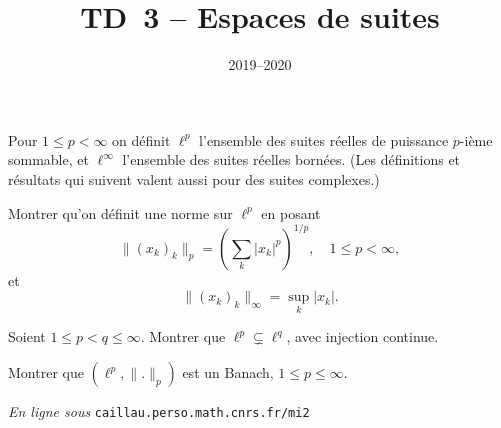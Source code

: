 \documentclass[11pt,a4paper]{article}
\title{TD~3 -- Espaces de suites}
\date{2019--2020}
\def\K{\mathbf{K}}
\def\iy{\infty}
\def\vphi{\varphi}
\begin{document}
\maketitle

Pour $1 \leq p < \iy$ on d\'efinit $\ell^p$ l'ensemble des suites r\'eelles
de puissance $p$-i\`eme sommable, et $\ell^\iy$ l'ensemble des suites r\'eelles born\'ees.
(Les d\'efinitions et r\'esultats qui suivent valent aussi pour des suites complexes.)

\begin{Exercice}
Montrer qu'on
d\'efinit une norme sur $\ell^p$ en posant
\[ \|(x_k)_k\|_p = (\sum_k |x_k|^p)^{1/p},\quad 1 \leq p < \iy, \]
et
\[ \|(x_k)_k\|_\iy = \sup_k |x_k|. \]
\end{Exercice}

\begin{Exercice} Soient $1 \leq p < q \leq \infty$.
Montrer que $\ell^p \subsetneq \ell^q$, avec
injection continue.
\end{Exercice} \vspace*{1em}

\begin{Exercice} Montrer que $(\ell^p,\|.\|_p)$ est un Banach, $1 \leq p
\leq \iy$. \end{Exercice} \vspace*{1em}

%
%

\vfill \begin{flushright}{\footnotesize \emph{En ligne sous}
\texttt{caillau.perso.math.cnrs.fr/mi2}} \end{flushright}
\end{document}
